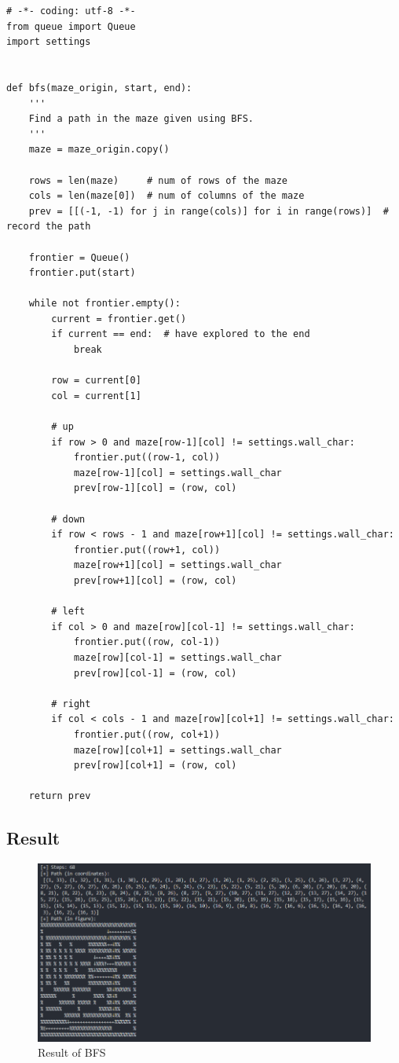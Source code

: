 \documentclass[a4paper, 11pt]{article}
\begin{document}
\begin{lstlisting}[title=bfs.py]
# -*- coding: utf-8 -*-
from queue import Queue
import settings


def bfs(maze_origin, start, end):
    '''
    Find a path in the maze given using BFS.
    '''
    maze = maze_origin.copy()

    rows = len(maze)     # num of rows of the maze
    cols = len(maze[0])  # num of columns of the maze
    prev = [[(-1, -1) for j in range(cols)] for i in range(rows)]  # record the path

    frontier = Queue()
    frontier.put(start)

    while not frontier.empty():
        current = frontier.get()
        if current == end:  # have explored to the end
            break

        row = current[0]
        col = current[1]

        # up
        if row > 0 and maze[row-1][col] != settings.wall_char:
            frontier.put((row-1, col))
            maze[row-1][col] = settings.wall_char
            prev[row-1][col] = (row, col)

        # down
        if row < rows - 1 and maze[row+1][col] != settings.wall_char:
            frontier.put((row+1, col))
            maze[row+1][col] = settings.wall_char
            prev[row+1][col] = (row, col)

        # left
        if col > 0 and maze[row][col-1] != settings.wall_char:
            frontier.put((row, col-1))
            maze[row][col-1] = settings.wall_char
            prev[row][col-1] = (row, col)

        # right
        if col < cols - 1 and maze[row][col+1] != settings.wall_char:
            frontier.put((row, col+1))
            maze[row][col+1] = settings.wall_char
            prev[row][col+1] = (row, col)

    return prev
\end{lstlisting}

\subsection{Result}
\begin{figure}[ht]
\centering
\includegraphics[width=15cm]{assets/result1.png}
\caption{Result of BFS}
\end{figure}
\end{document}
